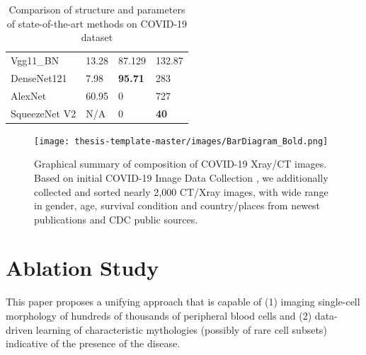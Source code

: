 \begin{table}[h]
\begin{tabular}{@{}llll@{}}
Vgg11\_BN     & 13.28                                                                           & 87.129                                                                            & 132.87                                                                        \\
DenseNet121   & 7.98                                                                            & {\color[HTML]{CB0000} \textbf{95.71}}                                             & 283                                                                           \\
AlexNet       & 60.95                                                                           & 0                                                                                 & 727                                                                           \\
SqueezeNet V2 & {\color[HTML]{000000} N/A}                                                      & 0                                                                                 & {\color[HTML]{CB0000} \textbf{40}}                                            \\ \bottomrule
\end{tabular}
\caption{Comparison of structure and parameters of state-of-the-art methods on COVID-19 dataset}
\end{table}

\begin{figure}[b]
\texttt{[image: thesis-template-master/images/BarDiagram\_Bold.png]}
\label{fig}
\centering
\caption{Graphical summary of composition of COVID-19 Xray/CT images. Based on initial COVID-19 Image Data Collection \cite{37}, we additionally collected and sorted nearly 2,000 CT/Xray images, with wide range in gender, age, survival condition and country/places from newest publications and CDC public sources\cite{36}\cite{37}\cite{38}. }
\end{figure}


\chapter{Ablation Study}
\label{sec:examples}

This paper proposes a unifying approach that is capable of (1) imaging single-cell morphology of hundreds of thousands of peripheral blood cells and (2) data-driven learning of characteristic mythologies (possibly of rare cell subsets) indicative of the presence of the disease.


